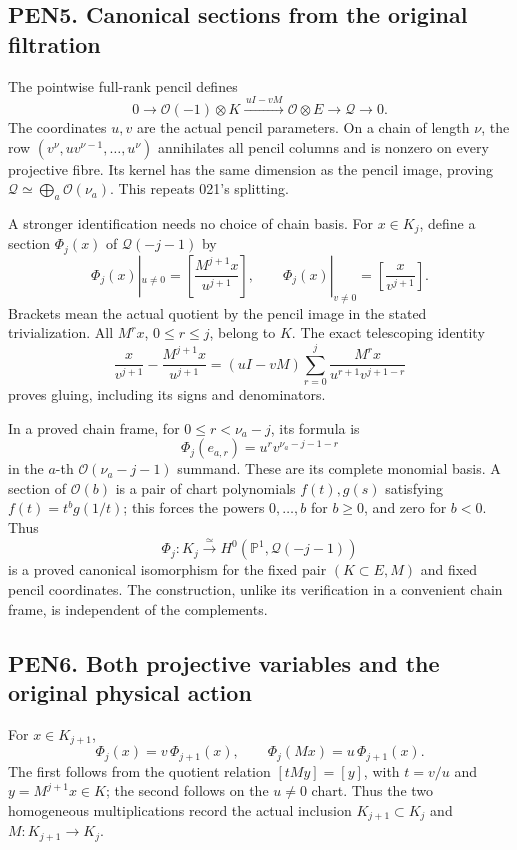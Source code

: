 \documentclass[11pt]{article}
\begin{document}
\subsection{PEN5. Canonical sections from the original filtration}\label{pen5.-canonical-sections-from-the-original-filtration}

The pointwise full-rank pencil defines \[
0\longrightarrow\mathcal O(-1)\otimes K
\xrightarrow{\,uI-vM\,}\mathcal O\otimes E
\longrightarrow\mathcal Q\longrightarrow0.
\] The coordinates \(u,v\) are the actual pencil parameters. On a chain of length \(\nu\), the row \((v^\nu,uv^{\nu-1},\ldots,u^\nu)\) annihilates all pencil columns and is nonzero on every projective fibre. Its kernel has the same dimension as the pencil image, proving \(\mathcal Q\simeq\bigoplus_a\mathcal O(\nu_a)\). This repeats 021's splitting.

A stronger identification needs no choice of chain basis. For \(x\in K_j\), define a section \(\Phi_j(x)\) of \(\mathcal Q(-j-1)\) by \[
\Phi_j(x)|_{u\ne0}=\left[\frac{M^{j+1}x}{u^{j+1}}\right],\qquad
\Phi_j(x)|_{v\ne0}=\left[\frac{x}{v^{j+1}}\right]. \tag{PEN9}
\] Brackets mean the actual quotient by the pencil image in the stated trivialization. All \(M^r x\), \(0\le r\le j\), belong to \(K\). The exact telescoping identity \[
\frac{x}{v^{j+1}}-\frac{M^{j+1}x}{u^{j+1}}
=(uI-vM)\sum_{r=0}^{j}
\frac{M^r x}{u^{r+1}v^{j+1-r}} \tag{PEN10}
\] proves gluing, including its signs and denominators.

In a proved chain frame, for \(0\le r<\nu_a-j\), its formula is \[
\Phi_j(e_{a,r})=u^r v^{\nu_a-j-1-r}
\] in the \(a\)-th \(\mathcal O(\nu_a-j-1)\) summand. These are its complete monomial basis. A section of \(\mathcal O(b)\) is a pair of chart polynomials \(f(t),g(s)\) satisfying \(f(t)=t^b g(1/t)\); this forces the powers \(0,\ldots,b\) for \(b\ge0\), and zero for \(b<0\). Thus \[
\Phi_j:K_j\xrightarrow{\ \simeq\ }H^0(\mathbb P^1,\mathcal Q(-j-1))
\] is a proved canonical isomorphism for the fixed pair \((K\subset E,M)\) and fixed pencil coordinates. The construction, unlike its verification in a convenient chain frame, is independent of the complements.

\subsection{PEN6. Both projective variables and the original physical action}\label{pen6.-both-projective-variables-and-the-original-physical-action}

For \(x\in K_{j+1}\), \[
\Phi_j(x)=v\,\Phi_{j+1}(x),\qquad
\Phi_j(Mx)=u\,\Phi_{j+1}(x). \tag{PEN11}
\] The first follows from the quotient relation \([tMy]=[y]\), with \(t=v/u\) and \(y=M^{j+1}x\in K\); the second follows on the \(u\ne0\) chart. Thus the two homogeneous multiplications record the actual inclusion \(K_{j+1}\subset K_j\) and \(M:K_{j+1}\to K_j\).
\end{document}
